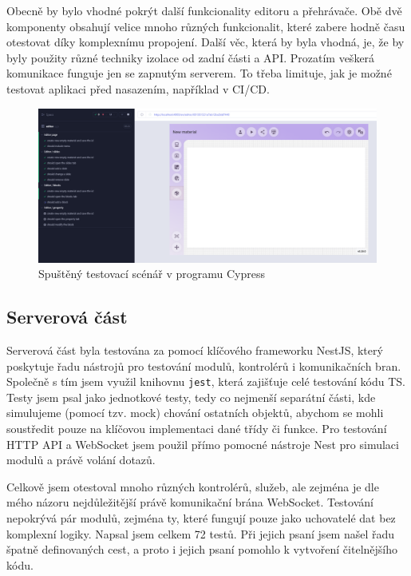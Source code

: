 Obecně by bylo vhodné pokrýt další funkcionality editoru a přehrávače. 
Obě dvě komponenty obsahují velice mnoho různých funkcionalit, které zabere hodně času otestovat díky komplexnímu propojení.
Další věc, která by byla vhodná, je, že by byly použity různé techniky izolace od zadní části a API.
Prozatím veškerá komunikace funguje jen se zapnutým serverem.
To třeba limituje, jak je možné testovat aplikaci před nasazením, například v CI/CD.


\begin{figure}[ht!]
    \centering
    \includegraphics[width=1\textwidth]{media/06_testovani/e2e.png}
    \caption{Spuštěný testovací scénář v programu Cypress}
    \label{fig:testovani/e2e}
\end{figure}


\subsection{Serverová část}

Serverová část byla testována za pomocí klíčového frameworku NestJS, který poskytuje řadu nástrojů pro testování modulů, kontrolérů i komunikačních bran.
Společně s tím jsem využil knihovnu \verb|jest|, která zajišťuje celé testování kódu TS.
Testy jsem psal jako jednotkové testy, tedy co nejmenší separátní části, kde simulujeme (pomocí tzv. mock) chování ostatních objektů, abychom se mohli soustředit pouze na klíčovou implementaci dané třídy či funkce.
Pro testování HTTP API a WebSocket jsem použil přímo pomocné nástroje Nest pro simulaci modulů a právě volání dotazů.

Celkově jsem otestoval mnoho různých kontrolérů, služeb, ale zejména je dle mého názoru nejdůležitější právě komunikační brána WebSocket.
Testování nepokrývá pár modulů, zejména ty, které fungují pouze jako uchovatelé dat bez komplexní logiky.
Napsal jsem celkem 72 testů.
Při jejich psaní jsem našel řadu špatně definovaných cest, a proto i jejich psaní pomohlo k vytvoření čitelnějšího kódu.

